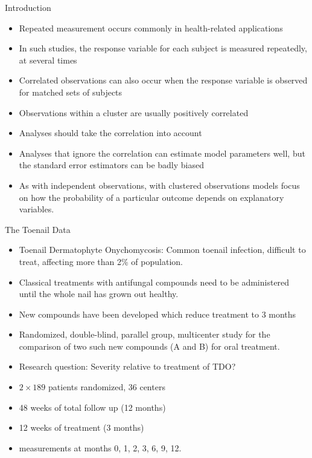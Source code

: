 \documentclass{beamer}
\begin{document}
\begin{frame}{Introduction}
\begin{itemize}
\item Repeated measurement occurs commonly in health-related applications \vspace{0.2cm}
\item In such studies, the response variable for each subject is measured repeatedly, at several times \vspace{0.2cm}
\item Correlated observations can also occur when the response variable is observed for matched sets of subjects \vspace{0.2cm}
\item Observations within a cluster are usually positively correlated \vspace{0.2cm}
\item Analyses should take the correlation into account
\item Analyses that ignore the correlation can estimate model parameters well, but the standard error estimators can be badly biased \vspace{0.25cm}
\item As with independent observations, with clustered observations models focus on how the probability of a particular outcome depends on explanatory variables.
\end{itemize}
\end{frame}

\begin{frame}{The Toenail Data}
\begin{itemize}
\item Toenail Dermatophyte Onychomycosis: Common toenail infection, difficult to treat, affecting more than 2\% of population.
\item Classical treatments with antifungal compounds need to be administered until the whole nail has grown out healthy.
\item New compounds have been developed which reduce treatment to 3 months
\item Randomized, double-blind, parallel group, multicenter study for the comparison of two such new compounds (A and B) for oral treatment.
\end{itemize}
\end{frame}

\begin{frame}
\begin{itemize}
	\item Research question: {\color{red}Severity relative to treatment of TDO?} \vspace{0.2cm}
\item $2 \times 189$ patients randomized, 36 centers \vspace{0.2cm}
\item 48 weeks of total follow up (12 months) \vspace{0.2cm} 
\item 12 weeks of treatment (3 months) \vspace{0.2cm}
\item measurements at months 0, 1, 2, 3, 6, 9, 12.
\end{itemize}
\end{frame}
\end{document}
